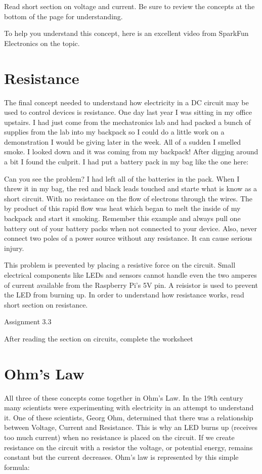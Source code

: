 \documentclass[
]{book}
\begin{document}
Read short section on voltage and current. Be sure to review the concepts at the bottom of the page for understanding.

To help you understand this concept, here is an excellent video from SparkFun Electronics on the topic.

\hypertarget{resistance}{%
\section{Resistance}\label{resistance}}

The final concept needed to understand how electricity in a DC circuit may be used to control devices is resistance. One day last year I was sitting in my office upstairs. I had just come from the mechatronics lab and had packed a bunch of supplies from the lab into my backpack so I could do a little work on a demonstration I would be giving later in the week. All of a sudden I smelled smoke. I looked down and it was coming from my backpack! After digging around a bit I found the culprit. I had put a battery pack in my bag like the one here:

Can you see the problem? I had left all of the batteries in the pack. When I threw it in my bag, the red and black leads touched and starte what is know as a short circuit. With no resistance on the flow of electrons through the wires. The by product of this rapid flow was heat which began to melt the inside of my backpack and start it smoking. Remember this example and always pull one battery out of your battery packs when not connected to your device. Also, never connect two poles of a power source without any resistance. It can cause serious injury.

This problem is prevented by placing a resistive force on the circuit. Small electrical components like LEDs and sensors cannot handle even the two amperes of current available from the Raspberry Pi's 5V pin. A reisistor is used to prevent the LED from burning up. In order to understand how resistance works, read short section on resistance.

Assignment 3.3

After reading the section on circuits, complete the worksheet

\hypertarget{ohms-law}{%
\section{Ohm's Law}\label{ohms-law}}

All three of these concepts come together in Ohm's Law. In the 19th century many scientists were experimenting with electricity in an attempt to understand it. One of these scientists, Georg Ohm, determined that there was a relationship between Voltage, Current and Resistance. This is why an LED burns up (receives too much current) when no resistance is placed on the circuit. If we create resistance on the circuit with a resistor the voltage, or potential energy, remains constant but the current decreases. Ohm's law is represented by this simple formula:
\end{document}
